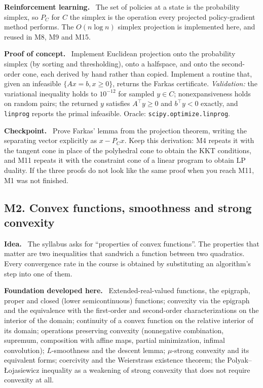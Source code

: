 \documentclass[11pt,a4paper]{article}
\newcommand{\mpart}[1]{\smallskip\noindent\textbf{#1}\ \ignorespaces}
\begin{document}
\mpart{Reinforcement learning.} The set of policies at a state is the probability simplex, so
$P_C$ for $C$ the simplex is the operation every projected policy-gradient method performs.
The $O(n \log n)$ simplex projection is implemented here, and reused in M8, M9 and M15.

\mpart{Proof of concept.} Implement Euclidean projection onto the probability simplex (by
sorting and thresholding), onto a halfspace, and onto the second-order cone, each derived by
hand rather than copied. Implement a routine that, given an infeasible $\{Ax=b, x\ge 0\}$,
returns the Farkas certificate. \emph{Validation:} the variational inequality holds to
$10^{-12}$ for sampled $y \in C$; nonexpansiveness holds on random pairs; the returned $y$
satisfies $A^\top y \ge 0$ and $b^\top y < 0$ exactly, and \texttt{linprog} reports the primal
infeasible. Oracle: \texttt{scipy.optimize.linprog}.

\mpart{Checkpoint.} Prove Farkas' lemma from the projection theorem, writing the separating
vector explicitly as $x - P_C x$. Keep this derivation: M4 repeats it with the tangent cone
in place of the polyhedral cone to obtain the KKT conditions, and M11 repeats it with the
constraint cone of a linear program to obtain LP duality. If the three proofs do not look
like the same proof when you reach M11, M1 was not finished.

\subsection{M2. Convex functions, smoothness and strong convexity}

\mpart{Idea.} The syllabus asks for ``properties of convex functions''. The properties that
matter are two inequalities that sandwich a function between two quadratics. Every
convergence rate in the course is obtained by substituting an algorithm's step into one of
them.

\mpart{Foundation developed here.} Extended-real-valued functions, the epigraph, proper and
closed (lower semicontinuous) functions; convexity via the epigraph and the equivalence with
the first-order and second-order characterizations on the interior of the domain; continuity
of a convex function on the relative interior of its domain; operations preserving convexity
(nonnegative combination, supremum, composition with affine maps, partial minimization,
infimal convolution); $L$-smoothness and the descent lemma; $\mu$-strong convexity and its
equivalent forms; coercivity and the Weierstrass existence theorem; the
Polyak--{\L}ojasiewicz inequality as a weakening of strong convexity that does not require
convexity at all.
\end{document}

